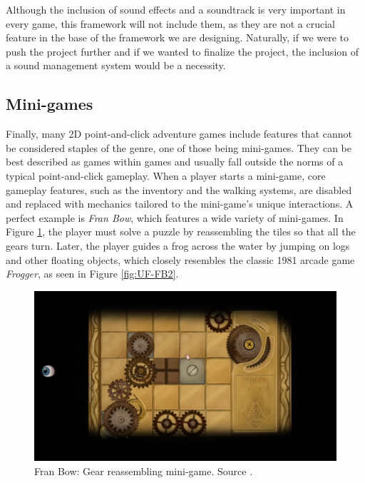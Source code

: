 \begin{notImplemented}
 \par
\vspace{3mm}
Although the inclusion of sound effects and a soundtrack is very important in every game, this framework will not include them, as they are not a crucial feature in the base of the framework we are designing. Naturally, if we were to push the project further and if we wanted to finalize the project, the inclusion of a sound management system would be a necessity.
\end{notImplemented}

\subsection{Mini-games}
\label{sec:Minigames}
Finally, many 2D point-and-click adventure games include features that cannot be considered staples of the genre, one of those being mini-games. They can be best described as games within games and usually fall outside the norms of a typical point-and-click gameplay. When a player starts a mini-game, core gameplay features, such as the inventory and the walking systems, are disabled and replaced with mechanics tailored to the mini-game’s unique interactions.  A perfect example is \textit{Fran Bow}, which features a wide variety of mini-games. In Figure \ref{fig:UF-FB1}, the player must solve a puzzle by reassembling the tiles so that all the gears turn. Later, the player guides a frog across the water by jumping on logs and other floating objects, which closely resembles the classic 1981 arcade game \textit{Frogger}, as seen in Figure \ref{fig:UF-FB2}. 

\begin{figure}[H]
\centering
\includegraphics[width=.8\linewidth]{img/FB_BF1.png}
\caption{Fran Bow: Gear reassembling mini-game. Source \cite{FranBow}.}
\label{fig:UF-FB1}
\end{figure}

